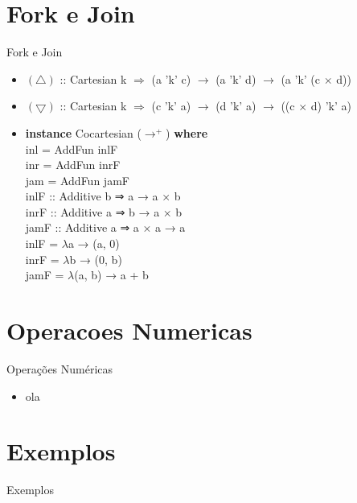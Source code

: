 \documentclass{beamer}
\begin{document}
\section{Fork e Join}
\begin{frame}{Fork e Join}
    \begin{itemize}
        \item
            $(\triangle)$ :: Cartesian k $\Rightarrow$ (a 'k' c) $\to$ (a 'k' d) $\to$ (a 'k' (c $\times$ d))
        \item
            $(\bigtriangledown)$ :: Cartesian k $\Rightarrow$ (c 'k' a) $\to$ (d 'k' a) $\to$ ((c $\times$ d) 'k' a)
            \pause
        \item
            \textbf{instance} Cocartesian ($\to^+$) \textbf{where}\\
                \hspace{1cm} inl = AddFun inlF\\
                \hspace{1cm} inr = AddFun inrF\\
                \hspace{1cm} jam = AddFun jamF\\
            \vspace{2mm} 
            inlF :: Additive b ⇒ a → a × b\\ 
            inrF :: Additive a ⇒ b → a × b\\
            jamF :: Additive a ⇒ a × a → a\\
            \vspace{2mm} 
            inlF = $\lambda$a → (a, 0)    \\ 
            inrF = $\lambda$b → (0, b)    \\
            jamF = $\lambda$(a, b) → a + b\\ 
    \end{itemize}
\end{frame}

\section{Operacoes Numericas}
\begin{frame}{Operações Numéricas}
    \begin{itemize}
        \item 
            ola
    \end{itemize}
\end{frame}

\section{Exemplos}
\begin{frame}{Exemplos}
\end{frame}
\end{document}
